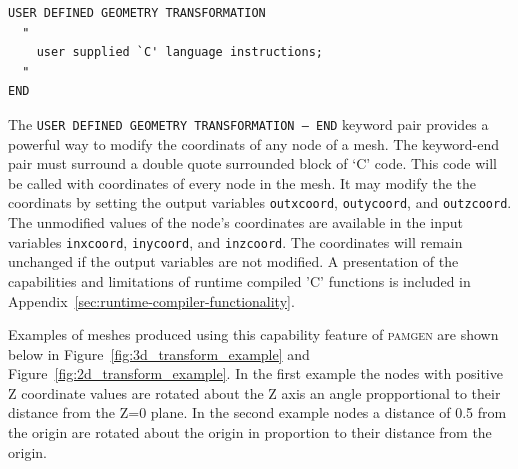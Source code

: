 {\ttfamily \small \begin{verbatim}
USER DEFINED GEOMETRY TRANSFORMATION
  "
    user supplied `C' language instructions;
  "
END
\end{verbatim}
}

The \texttt{USER DEFINED GEOMETRY TRANSFORMATION -- END} keyword pair provides
a powerful way to modify the coordinats of any node of a mesh. The keyword-end
pair must surround a double quote surrounded block of `C' code. This code will be called with coordinates of every node in the mesh. It may modify the the coordinats by setting the output variables \texttt{outxcoord}, \texttt{outycoord}, and \texttt{outzcoord}. The unmodified values of the node's coordinates are available in the input variables \texttt{inxcoord}, \texttt{inycoord}, and \texttt{inzcoord}.  The coordinates will remain unchanged if the output variables are not modified.  A presentation of the capabilities and
limitations of runtime compiled 'C' functions is included in
Appendix~\ref{sec:runtime-compiler-functionality}.

Examples of meshes produced using this capability feature of \textsc{pamgen} are shown below in Figure~\ref{fig:3d_transform_example} and Figure~\ref{fig:2d_transform_example}. In the first example the nodes with positive Z coordinate values are rotated about the Z axis an angle propportional to their distance from the Z=0 plane. In the second example nodes a distance of 0.5 from the origin are rotated about the origin in proportion to their distance from the origin.

